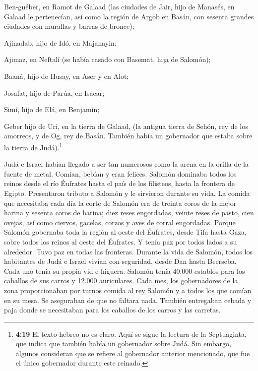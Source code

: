  Ben-guéber, en Ramot de Galaad (las ciudades de Jair, hijo
de Manasés, en Galaad le pertenecían, así como la región de Argob en
Basán, con sesenta grandes ciudades con murallas y barras de bronce);

 Ajinadab, hijo de Idó, en Majanayin;

 Ajimaz, en Neftalí (se había casado con Basemat, hija de
Salomón);

 Baaná, hijo de Husay, en Aser y en Alot;

 Josafat, hijo de Parúa, en Isacar;

 Simí, hijo de Elá, en Benjamín;

 Geber hijo de Uri, en la tierra de Galaad, (la antigua
tierra de Sehón, rey de los amorreos, y de Og, rey de Basán. También
había un gobernador que estaba sobre la tierra de Judá).\footnote{\textbf{4:19}
  El texto hebreo no es claro. Aquí se sigue la lectura de la
  Septuaginta, que indica que también había un gobernador sobre Judá.
  Sin embargo, algunos consideran que se refiere al gobernador anterior
  mencionado, que fue el único gobernador durante este reinado.}

 Judá e Israel habían llegado a ser tan numerosos como la
arena en la orilla de la fuente de metal. Comían, bebían y eran felices.
 Salomón dominaba todos los reinos desde el río Éufrates
hasta el país de los filisteos, hasta la frontera de Egipto. Presentaron
tributo a Salomón y le sirvieron durante su vida.  La
comida que necesitaba cada día la corte de Salomón era de treinta coros
de la mejor harina y sesenta coros de harina;  diez reses
engordadas, veinte reses de pasto, cien ovejas, así como ciervos,
gacelas, corzos y aves de corral engordadas.  Porque
Salomón gobernaba toda la región al oeste del Éufrates, desde Tifa hasta
Gaza, sobre todos los reinos al oeste del Éufrates. Y tenía paz por
todos lados a su alrededor. Tuvo paz en todas las fronteras.
 Durante la vida de Salomón, todos los habitantes de Judá e
Israel vivían con seguridad, desde Dan hasta Beerseba. Cada uno tenía su
propia vid e higuera.  Salomón tenía 40.000 establos para
los caballos de sus carros y 12.000 auriculares.  Cada mes,
los gobernadores de la zona proporcionaban por turnos comida al rey
Salomón y a todos los que comían en su mesa. Se aseguraban de que no
faltara nada.  También entregaban cebada y paja donde se
necesitaban para los caballos de los carros y las carretas.

